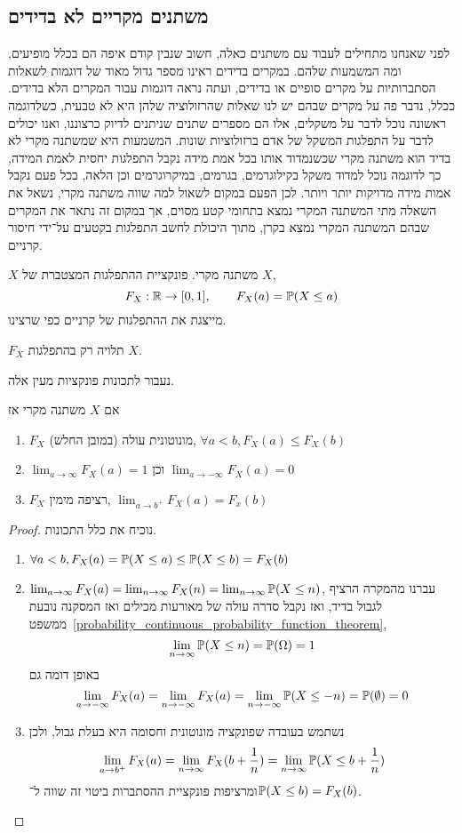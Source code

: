 \subsection{משתנים מקריים לא בדידים}
לפני שאנחנו מתחילים לעבוד עם משתנים כאלה, חשוב שנבין קודם איפה הם בכלל מופיעים, ומה המשמעות שלהם.
במקרים בדידים ראינו מספר גדול מאוד של דוגמות לשאלות הסתברותיות על מקרים סופיים או בדידים, ועתה נראה דוגמות עבור המקרים הלא בדידים.
ככלל, נדבר פה על מקרים שבהם יש לנו שאלות שהרזולוציה שלהן היא לא טבעית, כשלדוגמה ראשונה נוכל לדבר על משקלים, אלו הם מספרים שתנים שניתנים לדיוק כרצוננו, ואנו יכולים לדבר על התפלגות המשקל של אדם ברזולוציות שונות.
המשמעות היא שמשתנה מקרי לא בדיד הוא משתנה מקרי שכשנמדוד אותו בכל אמת מידה נקבל התפלגות יחסית לאמת המידה, כך לדוגמה נוכל למדוד משקל בקילוגרמים, בגרמים, במיקרוגרמים וכן הלאה, בכל פעם נקבל אמות מידה מדויקות יותר ויותר.
לכן הפעם במקום לשאול למה שווה משתנה מקרי, נשאל את השאלה מתי המשתנה המקרי נמצא בתחומי קטע מסוים, אך במקום זה נתאר את המקרים שבהם המשתנה המקרי נמצא בקרן, מתוך היכולת לחשב התפלגות בקטעים על־ידי חיסור קרניים.
\begin{definition}
	$X$ משתנה מקרי.
	פונקציית ההתפלגות המצטברת של $X$,
	\[
		F_X : \mathbb{R} \to [0, 1],
		\qquad
		F_X(a) = \mathbb{P}(X \le a)
	\]
	מייצגת את ההתפלגות של קרניים כפי שרצינו.
\end{definition}
\begin{remark}
	$F_X$ תלויה רק בהתפלגות $X$.
\end{remark}
נעבור לתכונות פונקציות מעין אלה.
\begin{proposition}
	אם $X$ משתנה מקרי אז
	\begin{enumerate}
		\item $F_X$ מונוטונית עולה (במובן החלש), $\forall a < b, F_X(a) \le F_X(b)$
		\item $\lim_{a \to \infty} F_X(a) = 1$ וכן $\lim_{a \to -\infty} F_X(a) = 0$
		\item $F_X$ רציפה מימין, $\lim_{a \to b^+} F_X(a) = F_x(b)$
	\end{enumerate}
\end{proposition}
\begin{proof}
	נוכיח את כלל התכונות.
	\begin{enumerate}
		\item $\forall a < b, F_X(a) = \mathbb{P}(X \le a) \le \mathbb{P}(X \le b) = F_X(b)$
		\item $\lim_{a \to \infty} F_X(a) = \lim_{n \to \infty} F_X(n) = \lim_{n \to \infty} \mathbb{P}(X \le n)$,
			עברנו מהמקרה הרציף לגבול בדיד, ואז נקבל סדרה עולה של מאורעות מכילים ואז המסקנה נובעת ממשפט\ \ref{probability_continuous_probability_function_theorem},
			\[
				\lim_{n \to \infty} \mathbb{P}(X \le n)
				= \mathbb{P}(\Omega)
				= 1
			\]
			באופן דומה גם
			\[
				\lim_{a \to -\infty} F_X(a)
				= \lim_{n \to -\infty} F_X(a)
				= \lim_{n \to -\infty} \mathbb{P}(X \le -n)
				= \mathbb{P}(\emptyset)
				= 0
			\]
		\item נשתמש בעובדה שפונקציה מונוטונית וחסומה היא בעלת גבול, ולכן
			\[
				\lim_{a \to b^+} F_X(a)
				= \lim_{n \to \infty} F_X(b + \frac{1}{n})
				= \lim_{n \to \infty} \mathbb{P}(X \le b + \frac{1}{n})
			\]
			ומרציפות פונקציית ההסתברות ביטוי זה שווה ל־$\mathbb{P}(X \le b) = F_X(b)$.
	\end{enumerate}
\end{proof}
